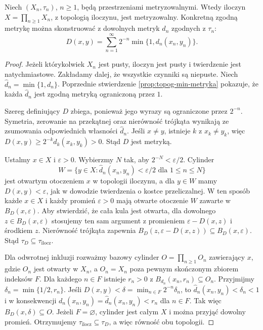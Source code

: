 \begin{twierdzenie}
\label{thm:topog-przeliczalny-iloczyn-metryzowalny}
Niech $(X_n,\tau_n)$, $n\ge1$, będą przestrzeniami
metryzowalnymi. Wtedy iloczyn
$X=\prod_{n\ge1}X_n$, z topologią iloczynu,
jest metryzowalny. Konkretną zgodną metrykę można
skonstruować z dowolnych metryk $d_n$ zgodnych z $\tau_n$:
\[
D(x,y)=\sum_{n=1}^{\infty}
2^{-n}\min\{1,d_n(x_n,y_n)\}.
\]
\end{twierdzenie}
\begin{proof}
Jeżeli którykolwiek $X_n$ jest pusty, iloczyn jest pusty
i twierdzenie jest natychmiastowe. Zakładamy dalej,
że wszystkie czynniki są niepuste.
Niech $\widehat d_n=\min\{1,d_n\}$.
Poprzednie stwierdzenie
\ref{prop:topog-min-metryka} pokazuje, że każda
$\widehat d_n$ jest zgodną metryką ograniczoną przez $1$.

Szereg definiujący $D$ zbiega, ponieważ jego wyrazy
są ograniczone przez $2^{-n}$. Symetria, zerowanie
na przekątnej oraz nierówność trójkąta wynikają ze
zsumowania odpowiednich własności $\widehat d_n$.
Jeśli $x\ne y$, istnieje $k$ z $x_k\ne y_k$,
więc $D(x,y)\ge2^{-k}\widehat d_k(x_k,y_k)>0$.
Stąd $D$ jest metryką.

Ustalmy $x\in X$ i $\varepsilon>0$.
Wybierzmy $N$ tak, aby $2^{-N}<\varepsilon/2$.
Cylinder
\[
W=\{y\in X:\widehat d_n(x_n,y_n)<\varepsilon/2
\text{ dla }1\le n\le N\}
\]
jest otwartym otoczeniem $x$ w topologii iloczynu,
a dla $y\in W$ mamy $D(x,y)<\varepsilon$,
jak w dowodzie twierdzenia o kostce przeliczalnej.
W ten sposób każde $x\in X$ i każdy promień
$\varepsilon>0$ mają otwarte otoczenie $W$
zawarte w $B_D(x,\varepsilon)$. Aby stwierdzić,
że cała kula jest otwarta, dla dowolnego
$z\in B_D(x,\varepsilon)$ stosujemy ten sam argument
z promieniem $\varepsilon-D(x,z)$ i środkiem $z$.
Nierówność trójkąta zapewnia
$B_D(z,\varepsilon-D(x,z))\subseteq B_D(x,\varepsilon)$.
Stąd $\tau_D\subseteq\tau_{\mathrm{ilocz}}$.

Dla odwrotnej inkluzji rozważmy bazowy cylinder
$O=\prod_{n\ge1}O_n$ zawierający $x$,
gdzie $O_n$ jest otwarty w $X_n$, a $O_n=X_n$
poza pewnym skończonym zbiorem indeksów $F$.
Dla każdego $n\in F$ istnieje $r_n>0$ z
$B_{d_n}(x_n,r_n)\subseteq O_n$.
Przyjmijmy $\delta_n=\min\{1/2,r_n\}$.
Jeśli $D(x,y)<\delta=\min_{n\in F}2^{-n}\delta_n$,
to $\widehat d_n(x_n,y_n)<\delta_n<1$ i w konsekwencji
$d_n(x_n,y_n)=\widehat d_n(x_n,y_n)<r_n$ dla $n\in F$.
Tak więc $B_D(x,\delta)\subseteq O$.
Jeżeli $F=\varnothing$, cylinder jest całym $X$
i można przyjąć dowolny promień. Otrzymujemy
$\tau_{\mathrm{ilocz}}\subseteq\tau_D$, a więc
równość obu topologii.
\end{proof}

